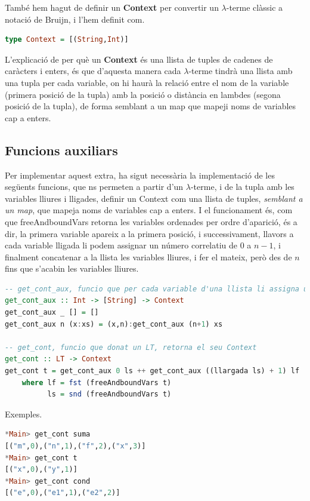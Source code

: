 \documentclass[10pt,a4paper]{article}
\begin{document}
També hem hagut de definir un \textbf{Context} per convertir un $\lambda$-terme clàssic a notació de Bruijn, i l'hem definit com.

\begin{lstlisting}[language=Haskell]
type Context = [(String,Int)]
\end{lstlisting}

L'explicació de per què un \textbf{Context} és una llista de tuples de cadenes de caràcters i enters, és que d'aquesta manera cada $\lambda$-terme tindrà una llista amb una tupla per cada variable, on hi haurà la relació entre el nom de la variable (primera posició de la tupla) amb la posició o distància en lambdes (segona posició de la tupla), de forma semblant a un map que mapeji noms de variables cap a enters.

\clearpage

\subsection{Funcions auxiliars}

Per implementar aquest extra, ha sigut necessària la implementació de les següents funcions, que ns permeten a partir d'un $\lambda$-terme, i de la tupla amb les variables lliures i lligades, definir un Context com una llista de tuples, \textit{semblant a un map}, que mapeja noms de variables cap a enters. I el funcionament és, com que freeAndboundVars retorna les variables ordenades per ordre d'aparició, és a dir, la primera variable apareix a la primera posició, i successivament, llavors a cada variable lligada li podem assignar un número correlatiu de $0$ a $n-1$, i finalment concatenar a la llista les variables lliures, i fer el mateix, però des de $n$ fins que s'acabin les variables lliures.

\begin{lstlisting}[language=Haskell]
-- get_cont_aux, funcio que per cada variable d'una llista li assigna un numero correlatiu de 0 a n
get_cont_aux :: Int -> [String] -> Context
get_cont_aux _ [] = []
get_cont_aux n (x:xs) = (x,n):get_cont_aux (n+1) xs

-- get_cont, funcio que donat un LT, retorna el seu Context
get_cont :: LT -> Context
get_cont t = get_cont_aux 0 ls ++ get_cont_aux ((llargada ls) + 1) lf
    where lf = fst (freeAndboundVars t)
          ls = snd (freeAndboundVars t)
\end{lstlisting}

Exemples.

\begin{lstlisting}[language=Haskell]
*Main> get_cont suma
[("m",0),("n",1),("f",2),("x",3)]
*Main> get_cont t
[("x",0),("y",1)]
*Main> get_cont cond
[("e",0),("e1",1),("e2",2)]
\end{lstlisting}
\end{document}
